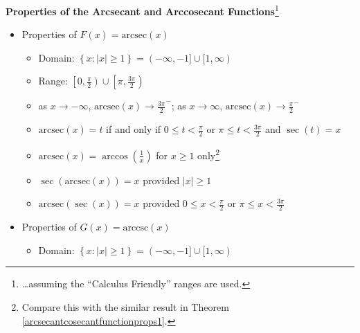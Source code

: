 \colorbox{ResultColor}{\bbm

\begin{thm} \label{arcsecantcosecantfunctionprops2}  \textbf{Properties of the Arcsecant and Arccosecant Functions}\footnote{\ldots assuming the ``Calculus Friendly'' ranges are used.}  

\begin{itemize}

\item Properties of $F(x)= \mbox{arcsec}(x)$  

\begin{itemize}

\item Domain: $\left\{ x : |x| \geq 1 \right\} = (-\infty, -1] \cup [1,\infty)$

\item Range: $\left[0, \frac{\pi}{2} \right) \cup \left[\pi, \frac{3\pi}{2} \right)$

\item  as $x \rightarrow -\infty$, $\mbox{arcsec}(x) \rightarrow \frac{3\pi}{2}^{-}$;  as $x \rightarrow \infty$, $\mbox{arcsec}(x) \rightarrow \frac{\pi}{2}^{-}$

\item  $\mbox{arcsec}(x) = t$ if and only if $0 \leq t < \frac{\pi}{2}$ or $ \pi \leq  t < \frac{3\pi}{2}$ and $\sec(t) = x$

\item  $\mbox{arcsec}(x) = \arccos\left(\frac{1}{x}\right)$ for $x \geq 1$ only\footnote{Compare this with the similar result in Theorem \ref{arcsecantcosecantfunctionprops1}.}

\item  $\sec\left(\mbox{arcsec}(x)\right) = x$ provided $|x| \geq 1$

\item  $\mbox{arcsec}(\sec(x)) = x$ provided $0 \leq x < \frac{\pi}{2}$ or $ \pi \leq  x < \frac{3\pi}{2}$


\end{itemize}

\item Properties of $G(x) = \mbox{arccsc}(x)$  

\begin{itemize}

\item Domain: $\left\{ x : |x| \geq 1 \right\} = (-\infty, -1] \cup [1,\infty)$


\end{itemize}
\end{itemize}
\end{thm}}
